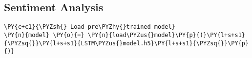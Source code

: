     \hypertarget{sentiment-analysis}{%
\subsection{Sentiment Analysis}\label{sentiment-analysis}}

    \begin{tcolorbox}[breakable, size=fbox, boxrule=1pt, pad at break*=1mm,colback=cellbackground, colframe=cellborder]
\begin{Verbatim}[commandchars=\\\{\}]
\PY{c+c1}{\PYZsh{} Load pre\PYZhy{}trained model}
\PY{n}{model} \PY{o}{=} \PY{n}{load\PYZus{}model}\PY{p}{(}\PY{l+s+s1}{\PYZsq{}}\PY{l+s+s1}{LSTM\PYZus{}model.h5}\PY{l+s+s1}{\PYZsq{}}\PY{p}{)}
\end{Verbatim}
\end{tcolorbox}

